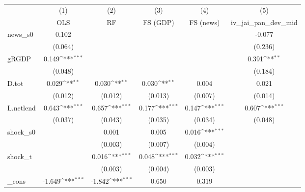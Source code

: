 {
\def\sym#1{\ifmmode^{#1}\else\(^{#1}\)\fi}
\begin{tabular}{l*{5}{c}}
\toprule
            &\multicolumn{1}{c}{(1)}&\multicolumn{1}{c}{(2)}&\multicolumn{1}{c}{(3)}&\multicolumn{1}{c}{(4)}&\multicolumn{1}{c}{(5)}\\
            &\multicolumn{1}{c}{OLS}&\multicolumn{1}{c}{RF}&\multicolumn{1}{c}{FS (GDP)}&\multicolumn{1}{c}{FS (news)}&\multicolumn{1}{c}{iv\_jai\_pan\_dev\_mid}\\
\midrule
news\_s0     &       0.102         &                     &                     &                     &      -0.077         \\
            &     (0.064)         &                     &                     &                     &     (0.236)         \\
\addlinespace
gRGDP       &       0.149\sym{***}&                     &                     &                     &       0.391\sym{**} \\
            &     (0.048)         &                     &                     &                     &     (0.184)         \\
\addlinespace
D.tot       &       0.029\sym{**} &       0.030\sym{**} &       0.030\sym{**} &       0.004         &       0.021         \\
            &     (0.012)         &     (0.012)         &     (0.013)         &     (0.007)         &     (0.014)         \\
\addlinespace
L.netlend   &       0.643\sym{***}&       0.657\sym{***}&       0.177\sym{***}&       0.147\sym{***}&       0.607\sym{***}\\
            &     (0.037)         &     (0.043)         &     (0.035)         &     (0.034)         &     (0.048)         \\
\addlinespace
shock\_s0    &                     &       0.001         &       0.005         &       0.016\sym{***}&                     \\
            &                     &     (0.003)         &     (0.007)         &     (0.004)         &                     \\
\addlinespace
shock\_t     &                     &       0.016\sym{***}&       0.048\sym{***}&       0.032\sym{***}&                     \\
            &                     &     (0.003)         &     (0.004)         &     (0.003)         &                     \\
\addlinespace
\_cons      &      -1.649\sym{***}&      -1.842\sym{***}&       0.650         &       0.319         &                     \\

\end{tabular}}
